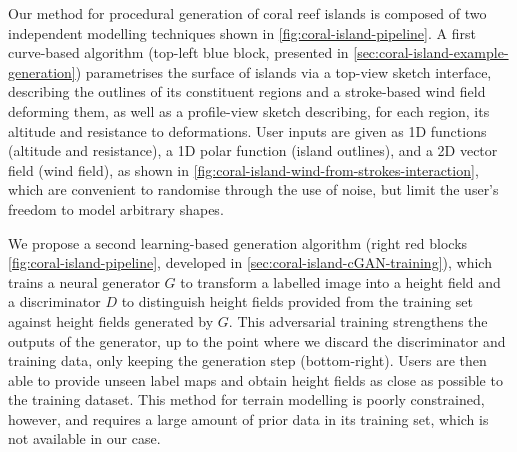 




Our method for procedural generation of coral reef islands is composed of two independent modelling techniques shown in \cref{fig:coral-island-pipeline}. A first curve-based algorithm (top-left blue block, presented in \cref{sec:coral-island-example-generation}) parametrises the surface of islands via a top-view sketch interface, describing the outlines of its constituent regions and a stroke-based wind field deforming them, as well as a profile-view sketch describing, for each region, its altitude and resistance to deformations. User inputs are given as 1D functions (altitude and resistance), a 1D polar function (island outlines), and a 2D vector field (wind field), as shown in \cref{fig:coral-island-wind-from-strokes-interaction}, which are convenient to randomise through the use of noise, but limit the user's freedom to model arbitrary shapes.

We propose a second learning-based generation algorithm (right red blocks \cref{fig:coral-island-pipeline}, developed in \cref{sec:coral-island-cGAN-training}), which trains a neural generator $G$ to transform a labelled image into a height field and a discriminator $D$ to distinguish height fields provided from the training set against height fields generated by $G$. This adversarial training strengthens the outputs of the generator, up to the point where we discard the discriminator and training data, only keeping the generation step (bottom-right). Users are then able to provide unseen label maps and obtain height fields as close as possible to the training dataset. This method for terrain modelling is poorly constrained, however, and requires a large amount of prior data in its training set, which is not available in our case.

